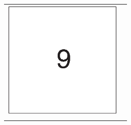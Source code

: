 \documentclass[11pt, oneside]{article}
\begin{document}
\begin{figure}[htbp]
\begin{tabular}{cc}
\begin{minipage}{0.333\hsize}
\begin{center}
\includegraphics[width=57mm]{../data/fig9.eps}
\end{center}
\end{minipage}
\\\vspace{\vmargin}
\end{tabular}
\end{figure}
\end{document}
